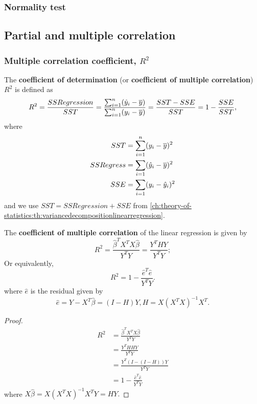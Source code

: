 \begin{refsection}
\subsubsection{Normality test}



\subsection{Partial and multiple correlation}

\subsubsection{Multiple correlation coefficient, $R^2$}

\begin{definition}
	The \textbf{coefficient of determination} (or \textbf{coefficient of multiple correlation}) $R^2$ is defined as 
	$$R^2 = \frac{SSRegression}{SST} = \frac{\sum_{i=1}^n (\hat{y}_i - \overline{y})}{\sum_{i=1}^n (y_i - \overline{y})} = \frac{SST - SSE}{SST} = 1 -\frac{SSE}{SST},$$
where	
\begin{align*}
SST &= \sum_{i=1}^{n} (y_i - \overline{y})^2 \\
SSRegress &= \sum_{i=1} (\hat{y}_i - \overline{y})^2\\
SSE&= \sum_{i=1} (y_i - \hat{y}_i)^2
\end{align*}
and we use $SST = SSRegression + SSE$ from \autoref{ch:theory-of-statistics:th:variancedecompositionlinearregression}. 
\end{definition}


\begin{lemma}\cite[164]{theil1971principles}\label{ch:regression-analysis:th:PropertiesLinearRegressionCoefficientMultipleCorrelation}
The \textbf{coefficient of multiple correlation} of the linear regression is given by
$$R^2 = \frac{\hat{\beta}^T X^TX \hat{\beta}}{Y^TY} =\frac{Y^THY}{Y^TY};$$
Or equivalently,  $$R^2 = 1-\frac{\hat{e}^T\hat{e}}{Y^TY}.$$
where $\hat{e}$ is the residual given by
$$\hat{e} = Y - X^T\hat{\beta} = (I - H)Y,H = X(X^TX)^{-1}X^T.$$	
\end{lemma}
\begin{proof}
\begin{align*}
R^2 &= \frac{\hat{\beta}^T X^TX \hat{\beta}}{Y^TY} \\
	&= \frac{Y^THHY}{Y^TY} \\
	&= \frac{Y^T(I - (I-H))Y}{Y^TY} \\
	&=  1 - \frac{\hat{e}^T\hat{e}}{Y^TY}
\end{align*}	
where $X\hat{\beta} = X(X^TX)^{-1}X^TY = HY.$
\end{proof}


\end{refsection}
